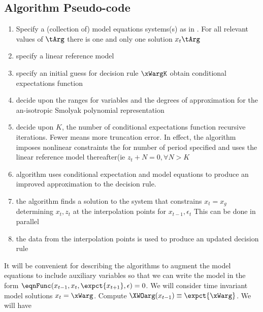 \documentclass[12pt]{article}
\begin{document}
\subsection{Algorithm Pseudo-code}
\label{sec:pseudocode}

\begin{enumerate}
\item Specify a (collection of) model equations systems(s) 
as in .
For all relevant values of $\tArg$ there is one and only one solution $x_t\tArg$
\item specify a linear reference model
\item specify an initial guess for decision rule $\xWargK$ obtain conditional expectations function
\item decide upon the ranges for variables and the degrees of approximation for the an-isotropic Smolyak polynomial representation
\item decide upon $K$, the number of conditional expectations function recursive iterations.  Fewer means more truncation error. In effect, 
the algorithm imposes nonlinear constraints the for number of period specified 
and uses the linear reference model thereafter(ie $z_t+N=0, \forall N>K$
\item algorithm uses conditional expectation and model equations to produce an improved approximation to the decision rule.
\item the algorithm finds a solution to the system that constrains $x_t= x_g$ determining $x_t,z_t$ at the interpolation points for $x_{t-1},\epsilon_t$  This can be done in parallel
\item the data from the interpolation points is used to produce an updated decision rule
\end{enumerate}



It will be convenient for describing the algorithms to
 augment the model equations to include auxiliary variables so that we can write the model in the form
$  \eqnFunc(x_{t-1},x_t,\expct{x_{t+1}},\epsilon)=0$.  We will consider time invariant model solutions $x_t=\xWarg$.  Compute $\XWOarg(x_{t-1})\equiv \expct{\xWarg}$. We will have
\end{document}

